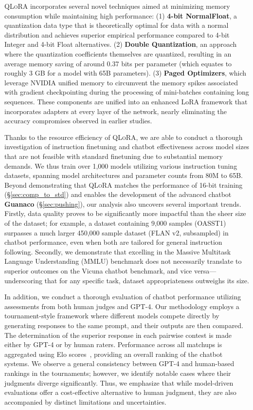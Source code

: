 \textsc{QLoRA} incorporates several novel techniques aimed at minimizing memory consumption while maintaining high performance: (1) \textbf{4-bit NormalFloat}, a quantization data type that is theoretically optimal for data with a normal distribution and achieves superior empirical performance compared to 4-bit Integer and 4-bit Float alternatives. (2) \textbf{Double Quantization}, an approach where the quantization coefficients themselves are quantized, resulting in an average memory saving of around 0.37 bits per parameter (which equates to roughly 3 GB for a model with 65B parameters). (3) \textbf{Paged Optimizers}, which leverage NVIDIA unified memory to circumvent the memory spikes associated with gradient checkpointing during the processing of mini-batches containing long sequences. These components are unified into an enhanced LoRA framework that incorporates adapters at every layer of the network, nearly eliminating the accuracy compromises observed in earlier studies.

Thanks to the resource efficiency of \textsc{QLoRA}, we are able to conduct a thorough investigation of instruction finetuning and chatbot effectiveness across model sizes that are not feasible with standard finetuning due to substantial memory demands. We thus train over 1,000 models utilizing various instruction tuning datasets, spanning model architectures and parameter counts from 80M to 65B. Beyond demonstrating that \textsc{QLoRA} matches the performance of 16-bit training (\S\ref{sec:comp_to_std}) and enables the development of the advanced chatbot \textbf{Guanaco} (\S\ref{sec:pushing}), our analysis also uncovers several important trends. Firstly, data quality proves to be significantly more impactful than the sheer size of the dataset; for example, a dataset containing 9,000 samples (OASST1) surpasses a much larger 450,000 sample dataset (FLAN v2, subsampled) in chatbot performance, even when both are tailored for general instruction following. Secondly, we demonstrate that excelling in the Massive Multitask Language Understanding (MMLU) benchmark does not necessarily translate to superior outcomes on the Vicuna chatbot benchmark, and vice versa—underscoring that for any specific task, dataset appropriateness outweighs its size.

In addition, we conduct a thorough evaluation of chatbot performance utilizing assessments from both human judges and GPT-4. Our methodology employs a tournament-style framework where different models compete directly by generating responses to the same prompt, and their outputs are then compared. The determination of the superior response in each pairwise contest is made either by GPT-4 or by human raters. Performance across all matchups is aggregated using Elo scores~\citep{elo1967proposed, elo1978rating}, providing an overall ranking of the chatbot systems. We observe a general consistency between GPT-4 and human-based rankings in the tournaments; however, we identify notable cases where their judgments diverge significantly. Thus, we emphasize that while model-driven evaluations offer a cost-effective alternative to human judgment, they are also accompanied by distinct limitations and uncertainties.

